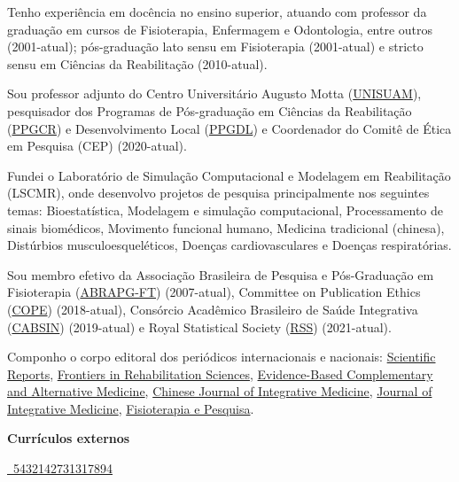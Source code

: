 \documentclass[
]{book}
\begin{document}
Tenho experiência em docência no ensino superior, atuando com professor da graduação em cursos de Fisioterapia, Enfermagem e Odontologia, entre outros (2001-atual); pós-graduação lato sensu em Fisioterapia (2001-atual) e stricto sensu em Ciências da Reabilitação (2010-atual).

Sou professor adjunto do Centro Universitário Augusto Motta (\href{https://www.unisuam.edu.br}{UNISUAM}), pesquisador dos Programas de Pós-graduação em Ciências da Reabilitação (\href{https://www.unisuam.edu.br/programa-pos-graduacao-ciencias-da-reabilitacao}{PPGCR}) e Desenvolvimento Local (\href{https://www.unisuam.edu.br/programa-pos-graduacao-desenvolvimento-local}{PPGDL}) e Coordenador do Comitê de Ética em Pesquisa (CEP) (2020-atual).

Fundei o Laboratório de Simulação Computacional e Modelagem em Reabilitação (LSCMR), onde desenvolvo projetos de pesquisa principalmente nos seguintes temas: Bioestatística, Modelagem e simulação computacional, Processamento de sinais biomédicos, Movimento funcional humano, Medicina tradicional (chinesa), Distúrbios musculoesqueléticos, Doenças cardiovasculares e Doenças respiratórias.

Sou membro efetivo da Associação Brasileira de Pesquisa e Pós-Graduação em Fisioterapia (\href{https://abrapg-ft.org.br/portal/}{ABRAPG-FT}) (2007-atual), Committee on Publication Ethics (\href{https://publicationethics.org}{COPE}) (2018-atual), Consórcio Acadêmico Brasileiro de Saúde Integrativa (\href{https://cabsin.org.br}{CABSIN}) (2019-atual) e Royal Statistical Society (\href{https://rss.org.uk}{RSS}) (2021-atual).

Componho o corpo editoral dos periódicos internacionais e nacionais: \href{https://www.nature.com/srep/about/editors}{Scientific Reports}, \href{https://www.frontiersin.org/research-topics/26395/systemic-effects-and-disabilities-in-long-covid-syndrome-current-approaches-and-clinical-challenges}{Frontiers in Rehabilitation Sciences}, \href{https://www.hindawi.com/journals/ecam/editors/}{Evidence-Based Complementary and Alternative Medicine}, \href{https://www.springer.com/journal/11655/editors}{Chinese Journal of Integrative Medicine}, \href{https://www.journals.elsevier.com/journal-of-integrative-medicine/editorial-board}{Journal of Integrative Medicine}, \href{https://www.scielo.br/journal/fp/about/\#editors}{Fisioterapia e Pesquisa}.

\textbf{Currículos externos}

\href{http://lattes.cnpq.br/5432142731317894}{~5432142731317894}
\end{document}
